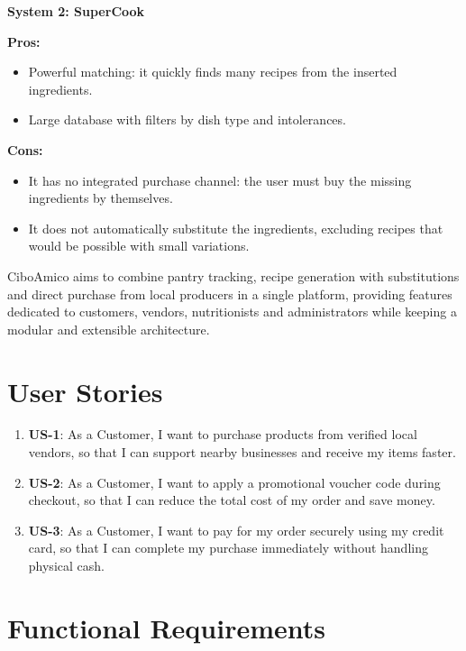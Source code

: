 \textbf{System 2: SuperCook}

\textbf{Pros:}
\begin{itemize}
    \item Powerful matching: it quickly finds many recipes from the inserted ingredients.
    \item Large database with filters by dish type and intolerances.
\end{itemize}

\textbf{Cons:}
\begin{itemize}
    \item It has no integrated purchase channel: the user must buy the missing ingredients by themselves.
    \item It does not automatically substitute the ingredients, excluding recipes that would be possible with small variations.
\end{itemize}

CiboAmico aims to combine pantry tracking, recipe generation with substitutions and direct purchase from local producers in a single platform, providing features dedicated to customers, vendors, nutritionists and administrators while keeping a modular and extensible architecture.

\section{User Stories}
\label{sec:user_stories}

\begin{enumerate}
    \item \textbf{US-1}: As a Customer, I want to purchase products from verified local vendors, so that I can support nearby businesses and receive my items faster.
    \item \textbf{US-2}: As a Customer, I want to apply a promotional voucher code during checkout, so that I can reduce the total cost of my order and save money.
    \item \textbf{US-3}: As a Customer, I want to pay for my order securely using my credit card, so that I can complete my purchase immediately without handling physical cash.
\end{enumerate}

\section{Functional Requirements}
\label{sec:requisiti_funzionali}

